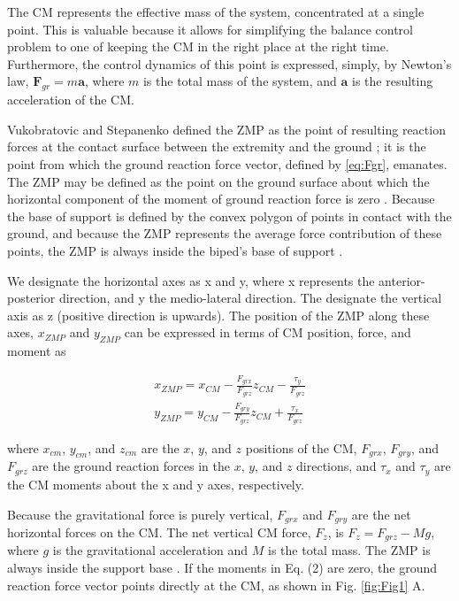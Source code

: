 \documentclass{llncs}
\begin{document}
The CM represents the effective mass of the system, concentrated at a single point.  
This is valuable because it allows for simplifying the balance control problem to one of keeping the CM in the right place at the right time.  
Furthermore, the control dynamics of this point is expressed, simply, by Newton’s law, $\mathbf{F}_{gr} = m \mathbf{a}$, where $m$ is the total
mass of the system, and $\mathbf{a}$ is the resulting acceleration of the CM.

Vukobratovic and Stepanenko defined the ZMP as the point of resulting reaction forces at the contact surface between the extremity and the ground \cite{vukobratovic1972stability};  
it is the point from which the ground reaction force vector, defined by \ref{eq:Fgr}, emanates.  
The ZMP may be defined as the point on the ground surface about which the horizontal component of the moment of ground reaction force is zero 
\cite{arakawa1997natural, vukobratovic2004zero}.
Because the base of support is defined by the convex polygon of points in contact with the ground, and because the ZMP represents the average force contribution 
of these points, the ZMP is always inside the biped’s base of support \cite{Gos99b}. 

We designate the horizontal axes as x and y, where x represents the anterior-posterior direction, and y the medio-lateral direction.
The designate the vertical axis as z (positive direction is upwards).
The position of the ZMP along these axes, $x_{ZMP}$ and $y_{ZMP}$ can be expressed in terms of CM position, force, and moment as

\begin{eqnarray}
x_{ZMP} = x_{CM} - \frac{F_{grx}}{F_{grz}} z_{CM} - \frac{\tau_y}{F_{grz}}\\
y_{ZMP} = y_{CM} - \frac{F_{gry}}{F_{grz}} z_{CM} + \frac{\tau_x}{F_{grz}}
\label{eq:ZMP}
\end{eqnarray}

\noindent where $x_{cm}$, $y_{cm}$, and $z_{cm}$ are the $x$, $y$, and $z$ positions of the CM, $F_{grx}$, $F_{gry}$, and $F_{grz}$ are the ground 
reaction forces in the $x$, $y$, and $z$ directions, and $\tau_x$ and $\tau_y$ are the CM moments about the x and y axes, respectively.

Because the gravitational force is purely vertical, $F_{grx}$ and $F_{gry}$ are the net horizontal forces on the CM.  The net vertical CM force, $F_z$,
is $F_z = F_{grz} - Mg$, where $g$ is the gravitational acceleration and $M$ is the total mass.
The ZMP is always inside the support base \cite{popovic2005ground}.  If the moments in Eq. (2) are zero, the ground reaction force vector points directly at the CM, as shown in Fig. \ref{fig:Fig1} A.
\end{document}
